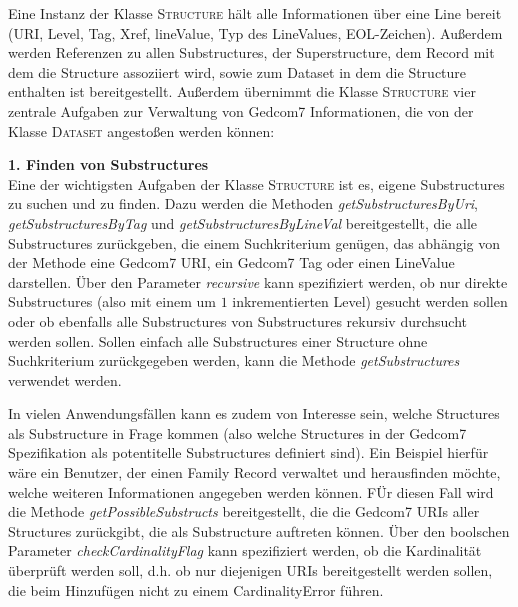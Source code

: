 Eine Instanz der Klasse \textsc{Structure} hält alle Informationen über eine Line bereit (URI, Level, Tag, Xref, lineValue, Typ des LineValues, EOL-Zeichen). Außerdem werden Referenzen zu allen Substructures, der Superstructure, dem Record mit dem die Structure assoziiert wird, sowie zum Dataset in dem die Structure enthalten ist bereitgestellt. Außerdem übernimmt die Klasse \textsc{Structure} vier zentrale Aufgaben zur Verwaltung von Gedcom7 Informationen, die von der Klasse \textsc{Dataset} angestoßen werden können:

\vspace{1em}
\textbf{1. Finden von Substructures} \vspace{0.5em} \\
Eine der wichtigsten Aufgaben der Klasse \textsc{Structure} ist es, eigene Substructures zu suchen und zu finden. Dazu werden die Methoden \textit{getSubstructuresByUri}, \textit{getSubstructuresByTag} und \textit{getSubstructuresByLineVal} bereitgestellt, die alle Substructures zurückgeben, die einem Suchkriterium genügen, das abhängig von der Methode eine Gedcom7 URI, ein Gedcom7 Tag oder einen LineValue darstellen. Über den Parameter \textit{recursive} kann spezifiziert werden, ob nur direkte Substructures (also mit einem um $1$ inkrementierten Level) gesucht werden sollen oder ob ebenfalls alle Substructures von Substructures rekursiv durchsucht werden sollen. Sollen einfach alle Substructures einer Structure ohne Suchkriterium zurückgegeben werden, kann die Methode \textit{getSubstructures} verwendet werden.


In vielen Anwendungsfällen kann es zudem von Interesse sein, welche Structures als Substructure in Frage kommen (also welche Structures in der Gedcom7 Spezifikation als potentitelle Substructures definiert sind). Ein Beispiel hierfür wäre ein Benutzer, der einen Family Record verwaltet und herausfinden möchte, welche weiteren Informationen angegeben werden können. FÜr diesen Fall wird die Methode \textit{getPossibleSubstructs} bereitgestellt, die die Gedcom7 URIs aller Structures zurückgibt, die als Substructure auftreten können. Über den boolschen Parameter \textit{checkCardinalityFlag} kann spezifiziert werden, ob die Kardinalität überprüft werden soll, d.h. ob nur diejenigen URIs bereitgestellt werden sollen, die beim Hinzufügen nicht zu einem CardinalityError führen. 

